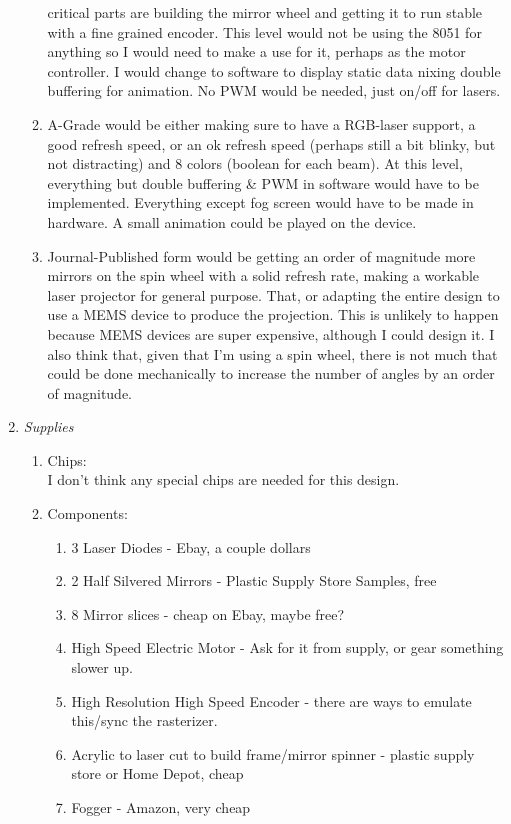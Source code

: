 \documentclass[12pt]{article}
\begin{document}
\begin{enumerate}
\begin{enumerate}
critical parts are building the mirror wheel and getting it to run
stable with a fine grained encoder. This level would not be using the 8051
for anything so I would need to make a use for it, perhaps as
the motor controller. I would change to software to display static data
nixing double buffering for animation.
No PWM would be needed, just on/off for lasers.
\item A-Grade would be either making sure to have a RGB-laser support,
a good refresh speed, or an ok refresh speed (perhaps still a bit
blinky, but not distracting) and 8 colors (boolean for each beam). At this
level, everything but double buffering \& PWM in software
would have to be implemented. Everything except fog screen would have to be made in hardware.
A small animation could be played on the device.
\item Journal-Published form would be getting an order of magnitude more
mirrors on the spin wheel with a solid refresh rate, making a workable
laser projector for general purpose. That, or adapting the entire design to use a MEMS
device to produce the projection. This is unlikely to happen because MEMS
devices are super expensive, although I could design it.
I also think that, given that I'm using a spin wheel, there is not much that
could be done mechanically to increase
the number of angles by an order of magnitude.
\end{enumerate}
\item
\emph{Supplies}
\begin{enumerate}
\item Chips:\\
I don't think any special chips are needed for this design.
\item Components:\\
\begin{enumerate}
\item 3 Laser Diodes - Ebay, a couple dollars
\item 2 Half Silvered Mirrors - Plastic Supply Store Samples, free
\item 8 Mirror slices - cheap on Ebay, maybe free?
\item High Speed Electric Motor - Ask for it from supply, or gear something slower up.
\item High Resolution High Speed Encoder - there are ways to emulate this/sync the rasterizer.
\item Acrylic to laser cut to build frame/mirror spinner 
- plastic supply store or Home Depot, cheap
\item Fogger - Amazon, very cheap

\end{enumerate}
\end{enumerate}
\end{enumerate}
\end{document}
